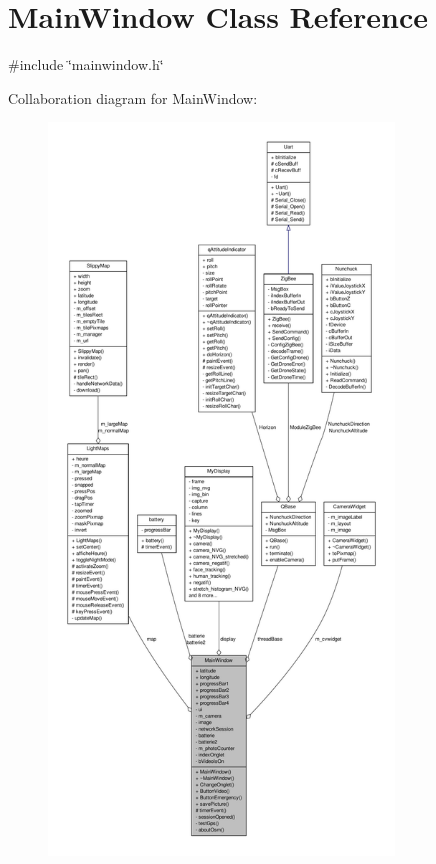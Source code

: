 \hypertarget{classMainWindow}{\section{Main\-Window Class Reference}
\label{classMainWindow}
}


{\ttfamily \#include \char`\"{}mainwindow.\-h\char`\"{}}



Collaboration diagram for Main\-Window\-:\nopagebreak
\begin{figure}[H]
\begin{center}
\leavevmode
\includegraphics[height=550pt]{classMainWindow__coll__graph}
\end{center}
\end{figure}
